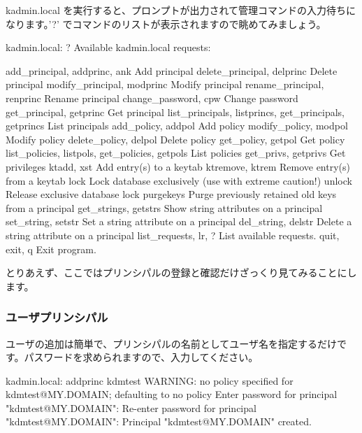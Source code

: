 \documentclass[mingoth,a4paper]{jsarticle}
\begin{document}
kadmin.local を実行すると、プロンプトが出力されて管理コマンドの入力待ちになります。'?' でコマンドのリストが表示されますので眺めてみましょう。

\begin{commandline}
kadmin.local:  ?
Available kadmin.local requests:

add_principal, addprinc, ank
                         Add principal
delete_principal, delprinc
                         Delete principal
modify_principal, modprinc
                         Modify principal
rename_principal, renprinc
                         Rename principal
change_password, cpw     Change password
get_principal, getprinc  Get principal
list_principals, listprincs, get_principals, getprincs
                         List principals
add_policy, addpol       Add policy
modify_policy, modpol    Modify policy
delete_policy, delpol    Delete policy
get_policy, getpol       Get policy
list_policies, listpols, get_policies, getpols
                         List policies
get_privs, getprivs      Get privileges
ktadd, xst               Add entry(s) to a keytab
ktremove, ktrem          Remove entry(s) from a keytab
lock                     Lock database exclusively (use with extreme caution!)
unlock                   Release exclusive database lock
purgekeys                Purge previously retained old keys from a principal
get_strings, getstrs     Show string attributes on a principal
set_string, setstr       Set a string attribute on a principal
del_string, delstr       Delete a string attribute on a principal
list_requests, lr, ?     List available requests.
quit, exit, q            Exit program.
\end{commandline}

とりあえず、ここではプリンシパルの登録と確認だけざっくり見てみることにします。

\subsubsection{ユーザプリンシパル}

ユーザの追加は簡単で、プリンシパルの名前としてユーザ名を指定するだけです。パスワードを求められますので、入力してください。

\begin{commandline}
kadmin.local:  addprinc kdmtest
WARNING: no policy specified for kdmtest@MY.DOMAIN; defaulting to no policy
Enter password for principal "kdmtest@MY.DOMAIN":
Re-enter password for principal "kdmtest@MY.DOMAIN":
Principal "kdmtest@MY.DOMAIN" created.
\end{commandline}
\end{document}
